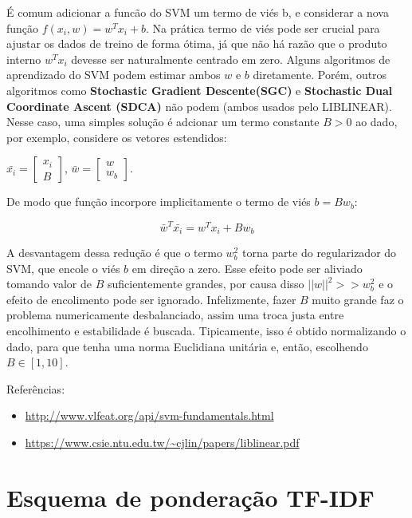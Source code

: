 \documentclass[]{article}
\begin{document}
É comum adicionar a funcão do SVM um termo de viés b, e considerar a
nova função \(f(x_i,w) = w^{T}x_i + b\). Na prática termo de viés pode
ser crucial para ajustar os dados de treino de forma ótima, já que não
há razão que o produto interno \(w^{T}x_i\) devesse ser naturalmente
centrado em zero. Alguns algoritmos de aprendizado do SVM podem estimar
ambos \(w\) e \(b\) diretamente. Porém, outros algoritmos como
\textbf{Stochastic Gradient Descente(SGC)} e \textbf{Stochastic Dual
Coordinate Ascent (SDCA)} não podem (ambos usados pelo LIBLINEAR). Nesse
caso, uma simples solução é adcionar um termo constante \(B > 0\) ao
dado, por exemplo, considere os vetores estendidos:

\(\bar{x_i}=\begin{bmatrix} x_i \\ B \end{bmatrix}\),
\(\bar{w}=\begin{bmatrix} w \\ w_b\end{bmatrix}\).

De modo que função incorpore implicitamente o termo de viés
\(b = Bw_b\):

\begin{equation}
  \bar{w}^T\bar{x_i} = w^Tx_i + Bw_b
\end{equation}

A desvantagem dessa redução é que o termo \(w^2_b\) torna parte do
regularizador do SVM, que encole o viés \(b\) em direção a zero. Esse
efeito pode ser aliviado tomando valor de \(B\) suficientemente grandes,
por causa disso \(||w||^2 >> w^2_b\) e o efeito de encolimento pode ser
ignorado. Infelizmente, fazer \(B\) muito grande faz o problema
numericamente desbalanciado, assim uma troca justa entre encolhimento e
estabilidade é buscada. Tipicamente, isso é obtido normalizando o dado,
para que tenha uma norma Euclidiana unitária e, então, escolhendo
\(B \in [1,10]\).

Referências:

\begin{itemize}
\itemsep1pt\parskip0pt
\item
  \url{http://www.vlfeat.org/api/svm-fundamentals.html}
\item
  \url{https://www.csie.ntu.edu.tw/~cjlin/papers/liblinear.pdf}
\end{itemize}

\section{Esquema de ponderação
TF-IDF}\label{esquema-de-ponderacao-tf-idf}
\end{document}
